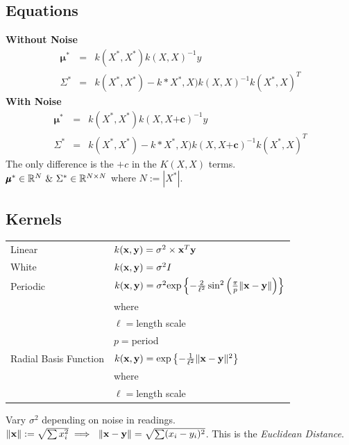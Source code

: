 \documentclass[11pt,a4paper]{article}
\begin{document}
\subsection{Equations}
\textbf{Without Noise}
\[\begin{array}{rcl}
\pmb\mu^*&=&k(X^*,X^*)k(X,X)^{-1}y\\
\Sigma^*&=&k(X^*,X^*)-k*X^*,X)k(X,X)^{-1}k(X^*,X)^T
\end{array}\]
\textbf{With Noise}
\[\begin{array}{rcl}
\pmb\mu^*&=&k(X^*,X^*)k(X,X\pmb{+c})^{-1}y\\
\Sigma^*&=&k(X^*,X^*)-k*X^*,X)k(X,X\pmb{+c})^{-1}k(X^*,X)^T
\end{array}\]
The only difference is the $+c$ in the $K(X,X)$ terms.\\
\nb $\pmb\mu^*\in\reals^N\ \&\ \Sigma^*\in\reals^{N\times N}$ where $N:=|X^*|$.

\subsection{Kernels}
\begin{center}
\begin{tabular}{l|l}
Linear&$k(\textbf{x},\textbf{y})=\sigma^2\times \textbf{x}^T\textbf{y}$\\
White&$k(\textbf{x},\textbf{y})=\sigma^2I$\\
Periodic&$k(\textbf{x},\textbf{y})=\sigma^2\text{exp}\left\{-\frac2{\ell^2}\sin^2\left(\frac{\pi}{p}\|\textbf{x}-\textbf{y}\|\right)\right\}$\\
&\quad where\\
&\quad\quad $\ell=$length scale\\
&\quad\quad $p=$period\\
Radial Basis Function&$k(\textbf{x},\textbf{y})=\text{exp}\left\{-\frac{1}{\ell^2}\|\textbf{x}-\textbf{y}\|^2\right\}$\\
&\quad where\\
&\quad\quad $\ell=$length scale\\
\end{tabular}
\end{center}
Vary $\sigma^2$ depending on noise in readings.\\
\nb $\|\x\|:=\sqrt{\sum x_i^2}\implies\ \|\x-\textbf{y}\|=\sqrt{\sum(x_i-y_i)^2}$. This is the \textit{Euclidean Distance}.
\end{document}
